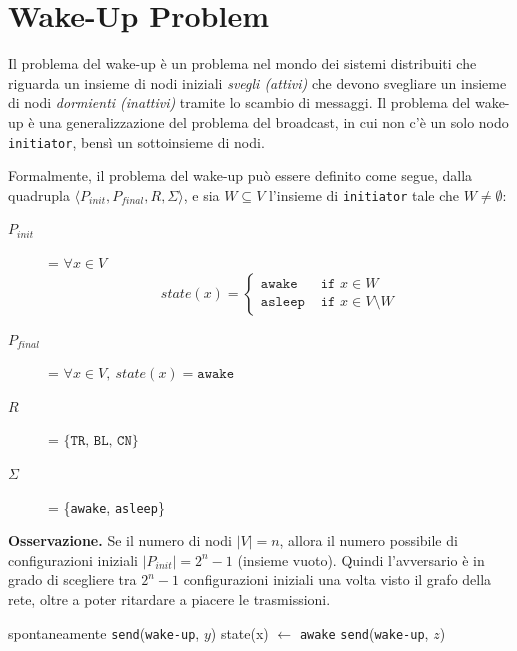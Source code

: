 \chapter{Wake-Up Problem}

Il problema del wake-up è un problema nel mondo dei sistemi distribuiti che riguarda un insieme di nodi iniziali \textit{svegli (attivi)} che devono svegliare un insieme di nodi \textit{dormienti (inattivi)} tramite lo scambio di messaggi. Il problema del wake-up è una generalizzazione del problema del broadcast, in cui non c'è un solo nodo \texttt{initiator}, bensì un sottoinsieme di nodi.

Formalmente, il problema del wake-up può essere definito come segue, dalla quadrupla $\langle P_{init}, P_{final}, R, \Sigma \rangle$, e sia $W \subseteq V$ l'insieme di \texttt{initiator} tale che $W \neq \emptyset$:
\begin{description}
    \item[$P_{init}$] = $\forall x \in V$
    \[
        state(x) =
        \begin{cases}
            \texttt{awake} & \texttt{ if } x \in W \\
            \texttt{asleep} & \texttt{ if } x \in V \setminus W
        \end{cases}
    \]
    \item[$P_{final}$] = $\forall x \in V,\ state(x) = \texttt{awake}$
    \item[$R$] = $\{\texttt{TR, BL, CN}\}$
    \item[$\Sigma$] = \{\texttt{awake}, \texttt{asleep}\} 
\end{description}

\textbf{Osservazione.} Se il numero di nodi $|V| = n$, allora il numero possibile di configurazioni iniziali $|P_{init}| = 2^n - 1$ (insieme vuoto). Quindi l'avversario è in grado di scegliere tra $2^n - 1$ configurazioni iniziali una volta visto il grafo della rete, oltre a poter ritardare a piacere le trasmissioni.

\begin{algorithm}[H]
\caption{Algoritmo WFlood}
\begin{algorithmic}
     spontaneamente
           \State \texttt{send}(\texttt{wake-up}, $y$)
        \EndFor
    \EndIf
        \State state(x) $\gets$ \texttt{awake}
           \State \texttt{send}(\texttt{wake-up}, $z$)
        \EndFor
    \EndIf
    \end{algorithmic}
\end{algorithm}

